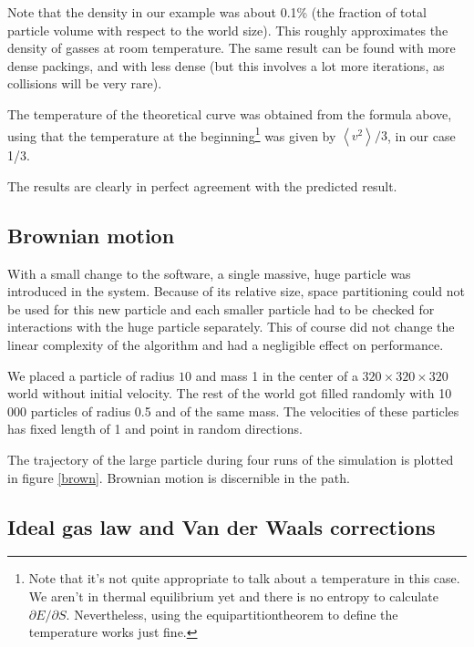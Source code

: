 Note that the density in our example was about 0.1\% (the fraction of total 
particle volume with respect to the world size). This roughly approximates 
the density of gasses at room temperature. The same result can be found 
with more dense packings, and with less dense (but this involves a lot more 
iterations, as collisions will be very rare).

The temperature of the theoretical curve was obtained from the formula 
above, using that the temperature at the beginning\footnote{Note that it's 
not quite appropriate to talk about a temperature in this case. We aren't 
in thermal equilibrium yet and there is no entropy to calculate $\partial E 
/ \partial S$. Nevertheless, using the equipartitiontheorem to define the 
temperature works just fine.}
was given by $\left<v^2\right>/3$, in our case 1/3.

The results are clearly in perfect agreement with the predicted result.


\subsection{Brownian motion}
With a small change to the software, a single massive, huge particle was 
introduced in the system. Because of its relative size, space partitioning 
could not be used for this new particle and each smaller particle had to be 
checked for interactions with the huge particle separately. This of course 
did not change the linear complexity of the algorithm and had a negligible 
effect on performance.

We placed a particle of radius $10$ and mass 1 in the center of a $320 
\times 320 \times 320$ world without initial velocity. The rest of the 
world got filled randomly with 10\,000 particles of radius 0.5 and of the 
same mass. The velocities of these particles has fixed length of 1 and
point in random directions.

The trajectory of the large particle during four runs of the simulation is 
plotted in figure \ref{brown}. Brownian motion is discernible in the path.




\subsection{Ideal gas law and Van der Waals corrections}

